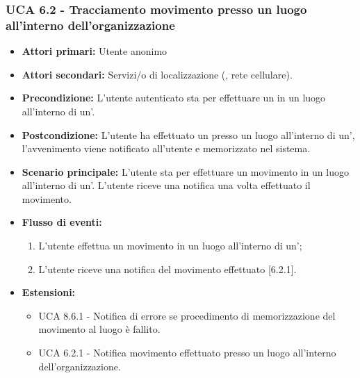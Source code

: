 \subsubsection{UCA 6.2 - Tracciamento movimento presso un luogo all'interno dell'organizzazione}
\begin{itemize}
	\item \textbf{Attori primari:} Utente anonimo
	\item \textbf{Attori secondari:} Servizi/o di localizzazione (, rete cellulare).
	\item \textbf{Precondizione:} L'utente autenticato sta per effettuare un  in un luogo all'interno di un'.
	\item \textbf{Postcondizione:} L'utente ha effettuato un  presso un luogo all'interno di un', l'avvenimento viene notificato all'utente e memorizzato nel sistema. 
	\item \textbf{Scenario principale:} L'utente sta per effettuare un movimento in un luogo all'interno di un'. L'utente riceve una notifica una volta effettuato il movimento.
	\item \textbf{Flusso di eventi:}
	\begin{enumerate}
		\item L'utente effettua un movimento in un luogo all'interno di un';
		\item L'utente riceve una notifica del movimento effettuato [6.2.1].
	\end{enumerate}
	\item \textbf{Estensioni:}
	\begin{itemize}
		\item UCA 8.6.1 - Notifica di errore se procedimento di memorizzazione del movimento al luogo è fallito.
		\item UCA 6.2.1 - Notifica movimento effettuato presso un luogo all'interno dell'organizzazione.
	\end{itemize}
\end{itemize}

